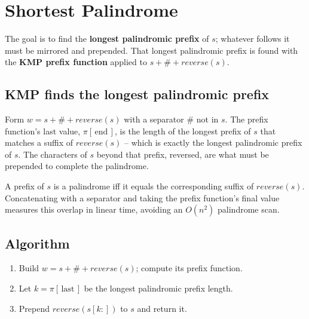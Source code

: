 \section{Shortest Palindrome}
\label{sec:str-shortest-palindrome}


\begin{patternbox}
The goal is to find the \textbf{longest palindromic prefix} of $s$; whatever
follows it must be mirrored and prepended. That longest palindromic prefix
is found with the \textbf{KMP prefix function} applied to
$s+\#+\textit{reverse}(s)$.
\end{patternbox}

\subsection*{KMP finds the longest palindromic prefix}

Form $w=s+\#+\textit{reverse}(s)$ with a separator $\#$ not in $s$. The
prefix function's last value, $\pi[\,\text{end}\,]$, is the length of the
longest prefix of $s$ that matches a suffix of $\textit{reverse}(s)$ -- which
is exactly the longest palindromic prefix of $s$. The characters of $s$
beyond that prefix, reversed, are what must be prepended to complete the
palindrome.

\begin{ideabox}
A prefix of $s$ is a palindrome iff it equals the corresponding suffix of
$\textit{reverse}(s)$. Concatenating with a separator and taking the prefix
function's final value measures this overlap in linear time, avoiding an
$O(n^2)$ palindrome scan.
\end{ideabox}

\subsection*{Algorithm}

\begin{enumerate}
  \item Build $w=s+\#+\textit{reverse}(s)$; compute its prefix function.
  \item Let $k=\pi[\,\text{last}\,]$ be the longest palindromic prefix
        length.
  \item Prepend $\textit{reverse}(s[k:])$ to $s$ and return it.
\end{enumerate}


